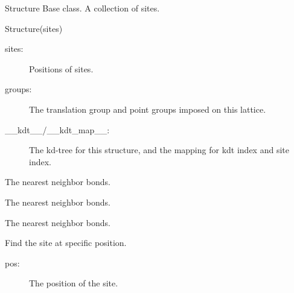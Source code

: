 \documentclass[letterpaper,10pt,oneside,openany]{sphinxmanual}
\begin{document}
\begin{fulllineitems}
\label{index:lattice.structure.Structure}
Structure Base class. A collection of sites.

Structure(sites)
\begin{description}
\item[{sites:}] \leavevmode
Positions of sites.

\item[{groups:}] \leavevmode
The translation group and point groups imposed on this lattice.

\item[{\_\_kdt\_\_/\_\_kdt\_map\_\_:}] \leavevmode
The kd-tree for this structure, and the mapping for kdt index and site index.

\end{description}

\begin{fulllineitems}
\label{index:lattice.structure.Structure.b1s}
The nearest neighbor bonds.

\end{fulllineitems}


\begin{fulllineitems}
\label{index:lattice.structure.Structure.b2s}
The nearest neighbor bonds.

\end{fulllineitems}


\begin{fulllineitems}
\label{index:lattice.structure.Structure.b3s}
The nearest neighbor bonds.

\end{fulllineitems}


\begin{fulllineitems}
\label{index:lattice.structure.Structure.findsite}
Find the site at specific position.
\begin{description}
\item[{pos:}] \leavevmode
The position of the site.


\end{description}
\end{fulllineitems}
\end{fulllineitems}
\end{document}
